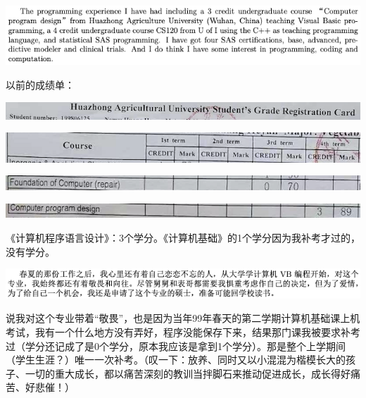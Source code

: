 \documentclass[9pt, b5paper]{article}
\begin{document}
\begin{center}
\includegraphics[width=.9\linewidth]{./pic/backups_plans_20210419_085025.png}
\end{center}

以前的成绩单：

\begin{center}
\includegraphics[width=.9\linewidth]{./pic/backups_plans_20210419_095006.png}
\end{center}

\begin{center}
\includegraphics[width=.9\linewidth]{./pic/backups_plans_20210419_093849.png}
\end{center}

\begin{center}
\includegraphics[width=.9\linewidth]{./pic/backups_plans_20210419_093428.png}
\end{center}

\begin{center}
\includegraphics[width=.9\linewidth]{./pic/backups_plans_20210419_093456.png}
\end{center}

《计算机程序语言设计》：3个学分。《计算机基础》的1个学分因为我补考才过的，没有学分。

\begin{center}
\includegraphics[width=.9\linewidth]{./pic/backups_plans_20210420_122207.png}
\end{center}

说我对这个专业带着“敬畏”，也是因为当年99年春天的第二学期计算机基础课上机考试，我有一个什么地方没有弄好，程序没能保存下来，结果那门课我被要求补考过（学分还记成了是0个学分，原本我应该是拿到1个学分）。那是整个上学期间（学生生涯？）唯一一次补考。（叹一下：放养、同时又以小混混为楷模长大的孩子、一切的重大成长，都以痛苦深刻的教训当拌脚石来推动促进成长，成长得好痛苦、好悲催！）
\end{document}
